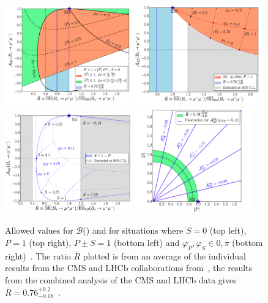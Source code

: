 \begin{figure}[tbp]
    \centering
        \includegraphics[width=0.49\textwidth]{./Figs/Theory/NP_S_0.png}
        \includegraphics[width=0.49\textwidth]{./Figs/Theory/NP_P_1.png}
        \includegraphics[width=0.49\textwidth]{./Figs/Theory/NP_P_pm_S_1.png}        
        \includegraphics[width=0.45\textwidth]{./Figs/Theory/NP_phi.png}
    \caption{Allowed values for $\mathcal{B}$(\bsmumu) and \ADG for situations where $S=0$ (top left), $P=1$ (top right), $P \pm S = 1$ (bottom left) and $\varphi_P, \varphi_S \in {0, \pi}$ (bottom right)~\cite{Buras:2013uqa,Knegjens:2014zva}. The ratio $\overline{R}$ plotted is from an average of the individual results from the CMS and LHCb collaborations from~\cite{CMSandLHCbCollaborations:2013pla}, the results from the combined analysis of the CMS and LHCb data gives $\overline{R} = 0.76^{+0.2}_{-0.18}$~\cite{CMS:2014xfa}.}
    \label{fig:NPmodelsB}
\end{figure}

